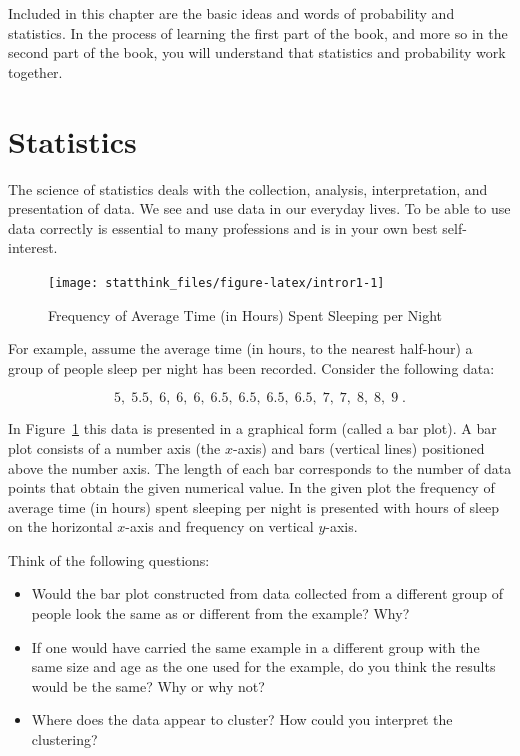 \documentclass[]{krantz}
\theoremstyle{definition}
\theoremstyle{definition}
\theoremstyle{definition}
\theoremstyle{remark}
\begin{document}
Included in this chapter are the basic ideas and words of probability
and statistics. In the process of learning the first part of the book,
and more so in the second part of the book, you will understand that
statistics and probability work together.

\hypertarget{statistics}{%
\section{Statistics}\label{statistics}}

The science of statistics deals with the collection, analysis,
interpretation, and presentation of data. We see and use data in our
everyday lives. To be able to use data correctly is essential to many
professions and is in your own best self-interest.

\begin{figure}

{\centering \texttt{[image: statthink\_files/figure-latex/intror1-1]} 

}

\caption{Frequency of Average Time (in Hours) Spent Sleeping per Night}\label{fig:intror1}
\end{figure}

For example, assume the average time (in hours, to the nearest
half-hour) a group of people sleep per night has been recorded. Consider
the following data:

\[5,\; 5.5,\; 6,\; 6,\; 6,\; 6.5,\; 6.5,\; 6.5,\; 6.5,\; 7,\; 7,\; 8,\; 8,\; 9\;.\]

In Figure~\ref{fig:intror1} this data is presented in a graphical form
(called a bar plot). A bar plot consists of a number axis (the \(x\)-axis)
and bars (vertical lines) positioned above the number axis. The length
of each bar corresponds to the number of data points that obtain the
given numerical value. In the given plot the frequency of average time
(in hours) spent sleeping per night is presented with hours of sleep on
the horizontal \(x\)-axis and frequency on vertical \(y\)-axis.

Think of the following questions:

\begin{itemize}
\item
  Would the bar plot constructed from data collected from a different
  group of people look the same as or different from the example? Why?
\item
  If one would have carried the same example in a different group with
  the same size and age as the one used for the example, do you think
  the results would be the same? Why or why not?
\item
  Where does the data appear to cluster? How could you interpret the
  clustering?
\end{itemize}
\end{document}
